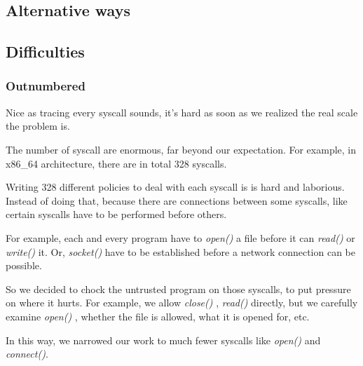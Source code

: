 \documentclass[conference,compsoc]{IEEEtran}
\begin{document}
	\subsection {Alternative ways}
	\subsection{Difficulties} %
		\subsubsection{Outnumbered}
			\par
				Nice as tracing every syscall sounds, it's hard as soon as we realized the real scale the problem is. 
			\par 
				The number of syscall are enormous, far beyond our expectation. 
				For example, in x86\_64 architecture, there are in total 328 syscalls. 
				\par
				Writing 328 different policies to deal with each syscall is is hard and laborious. Instead of doing that, because there are connections between some syscalls, like certain syscalls have to be performed before others.
				\par
				For example, each and every program have to \emph{ open() } a file before it can \emph{read()} or \emph{write()} it. 
				Or, \emph{ socket() } have to be established before a network connection can be possible.
			\par
				So we decided to chock the untrusted program on those syscalls, to put pressure on where it hurts. 
				For example, we allow \emph{ close() }, \emph{ read() } directly, but we carefully examine \emph{ open() }, whether the file is allowed, what it is opened for, etc.
			\par 
				In this way, we narrowed our work to much fewer syscalls like \emph{open()} and \emph{connect()}.
\end{document}
